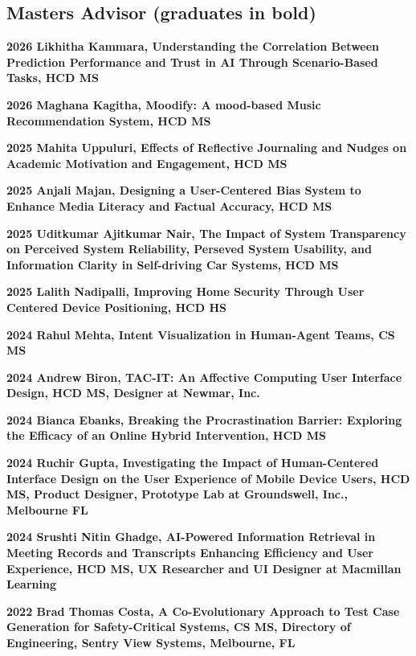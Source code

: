 \documentclass[12pt,letterpaper]{report}
\newcommand{\listitemspace}{0.25em}
\renewenvironment{itemize}
{\begin{list}{}{\setlength{\leftmargin}{0em}
                \setlength{\parskip}{0em}
                \setlength{\itemsep}{\listitemspace}
                \setlength{\parsep}{\listitemspace}}}
{\end{list}}
\begin{document}
    \subsection*{Masters Advisor (graduates in bold)}

    \begin{itemize}
        \item \textbf{2026 Likhitha Kammara, Understanding the Correlation Between Prediction Performance and Trust in AI Through Scenario-Based Tasks, HCD MS}
        \item \textbf{2026 Maghana Kagitha, Moodify: A mood-based Music Recommendation System, HCD MS}
        \item \textbf{2025 Mahita Uppuluri, Effects of Reflective Journaling and Nudges on Academic Motivation and Engagement, HCD MS} 
        \item \textbf{2025 Anjali Majan, Designing a User-Centered Bias System to Enhance Media Literacy and Factual Accuracy, HCD MS}
        \item \textbf{2025 Uditkumar Ajitkumar Nair, The Impact of System Transparency on Perceived System Reliability, Perseved System Usability, and Information Clarity in Self-driving Car Systems, HCD MS}
        \item \textbf{2025 Lalith Nadipalli, Improving Home Security Through User Centered Device Positioning, HCD HS}
        \item \textbf{2024 Rahul Mehta, Intent Visualization in Human-Agent Teams, CS MS}
        \item \textbf{2024 Andrew Biron, TAC-IT: An Affective Computing User Interface Design, HCD MS, Designer at Newmar, Inc.}
        \item \textbf{2024 Bianca Ebanks, Breaking the Procrastination Barrier: Exploring the Efficacy of an Online Hybrid Intervention, HCD MS}
        \item \textbf{2024 Ruchir Gupta, Investigating the Impact of Human-Centered Interface Design on the User Experience of Mobile Device Users, HCD MS, Product Designer, Prototype Lab at Groundswell, Inc., Melbourne FL}
        \item \textbf{2024 Srushti Nitin Ghadge, AI-Powered Information Retrieval in Meeting Records and Transcripts Enhancing Efficiency and User Experience, HCD MS, UX Researcher and UI Designer at Macmillan Learning}        
        \item \textbf{2022 Brad Thomas Costa, A Co-Evolutionary Approach to Test Case Generation for Safety-Critical Systems, CS MS, Directory of Engineering, Sentry View Systems, Melbourne, FL}

\end{itemize}
\end{document}
